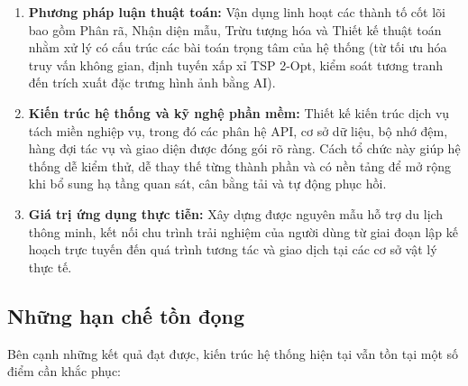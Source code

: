\documentclass[12pt, a4paper]{article}
\begin{document}
\begin{enumerate}
    \item \textbf{Phương pháp luận thuật toán:} Vận dụng linh hoạt các thành tố cốt lõi bao gồm Phân rã, Nhận diện mẫu, Trừu tượng hóa và Thiết kế thuật toán nhằm xử lý có cấu trúc các bài toán trọng tâm của hệ thống (từ tối ưu hóa truy vấn không gian, định tuyến xấp xỉ TSP 2-Opt, kiểm soát tương tranh đến trích xuất đặc trưng hình ảnh bằng AI).
    
    \item \textbf{Kiến trúc hệ thống và kỹ nghệ phần mềm:} Thiết kế kiến trúc dịch vụ tách miền nghiệp vụ, trong đó các phân hệ API, cơ sở dữ liệu, bộ nhớ đệm, hàng đợi tác vụ và giao diện được đóng gói rõ ràng. Cách tổ chức này giúp hệ thống dễ kiểm thử, dễ thay thế từng thành phần và có nền tảng để mở rộng khi bổ sung hạ tầng quan sát, cân bằng tải và tự động phục hồi.
    
    \item \textbf{Giá trị ứng dụng thực tiễn:} Xây dựng được nguyên mẫu hỗ trợ du lịch thông minh, kết nối chu trình trải nghiệm của người dùng từ giai đoạn lập kế hoạch trực tuyến đến quá trình tương tác và giao dịch tại các cơ sở vật lý thực tế.
\end{enumerate}

\subsection{Những hạn chế tồn đọng}
Bên cạnh những kết quả đạt được, kiến trúc hệ thống hiện tại vẫn tồn tại một số điểm cần khắc phục:
\end{document}
